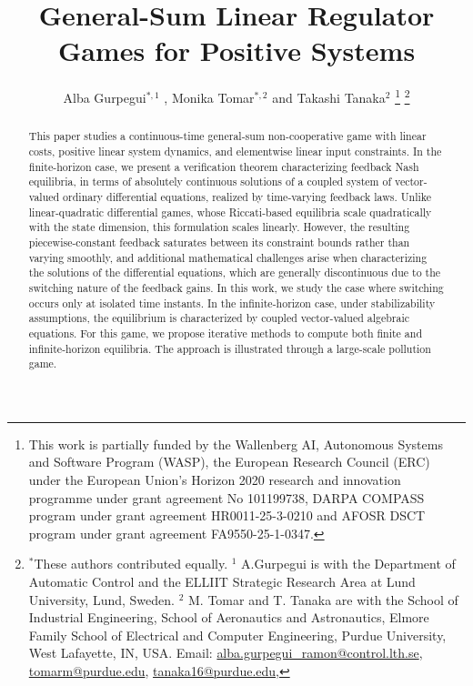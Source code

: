 \documentclass[letterpaper, 10 pt, conference]{ieeeconf}
\theoremstyle{definition}
\begin{document}
\title{General-Sum Linear Regulator Games for Positive Systems}

\author{Alba Gurpegui$^{*,1}$ , Monika Tomar$^{*,2}$ and Takashi Tanaka$^2$ %
\thanks{This work is partially funded by the Wallenberg AI, Autonomous Systems and Software Program (WASP), the European Research Council (ERC) under the European Union's Horizon 2020 research and innovation programme under grant agreement No 101199738, DARPA COMPASS program under grant agreement HR0011-25-3-0210 and AFOSR DSCT program under grant agreement FA9550-25-1-0347.}
\thanks{$^*$These authors contributed equally. $^1$ A.Gurpegui is with the Department of Automatic Control and the ELLIIT Strategic Research Area at Lund University, Lund, Sweden. $^2$ M. Tomar and T. Tanaka are with the School of Industrial Engineering, School of Aeronautics and Astronautics, Elmore Family School of Electrical and Computer Engineering, Purdue University, West Lafayette, IN, USA. Email: \href{mailto:alba.gurpegui@control.lth.se}{alba.gurpegui\_ramon@control.lth.se}, 
\href{mailto:tomarm@purdue.edu}{tomarm@purdue.edu}, 
\href{mailto:tanaka16@purdue.edu}{tanaka16@purdue.edu}, }
}
\maketitle
\begin{abstract}
This paper studies a continuous-time general-sum non-cooperative game with linear costs, positive linear system dynamics, and elementwise linear input constraints. In the finite-horizon case, we present %
a verification theorem characterizing feedback Nash equilibria, in terms of absolutely continuous solutions of a coupled system of vector-valued ordinary differential equations, realized by time-varying feedback laws. %
Unlike linear-quadratic differential games, whose Riccati-based equilibria scale quadratically with the state dimension, this formulation scales linearly. However, the resulting piecewise-constant feedback saturates between its constraint bounds rather than varying smoothly, and additional mathematical challenges arise when characterizing the solutions of the differential equations, which are generally discontinuous due to the switching nature of the feedback gains. In this work, we study the case where switching occurs only at isolated time instants. In the infinite-horizon case, under stabilizability assumptions, the equilibrium is characterized by coupled vector-valued algebraic equations. For this game, we propose iterative methods to compute both finite and infinite-horizon equilibria. The approach is illustrated through a large-scale pollution game.
\end{abstract}
\vspace{-3mm}
\end{document}
